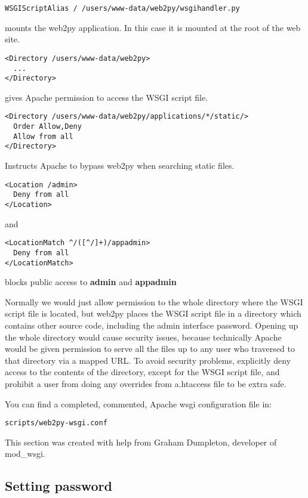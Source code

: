 \documentclass[justified,sixbynine,notoc]{tufte-book}
\begin{document}
\begin{fullwidth}
\begin{lstlisting}
WSGIScriptAlias / /users/www-data/web2py/wsgihandler.py
\end{lstlisting}
\noindent mounts the web2py application. In this case it is mounted at the root
of the web site.
\begin{lstlisting}[keywords={}]
<Directory /users/www-data/web2py>
  ...
</Directory>
\end{lstlisting}
\noindent gives Apache permission to access the WSGI script file.
\begin{lstlisting}[keywords={}]
<Directory /users/www-data/web2py/applications/*/static/>
  Order Allow,Deny
  Allow from all
</Directory>
\end{lstlisting}

Instructs Apache to bypass web2py when searching static files.
\begin{lstlisting}[keywords={}]
<Location /admin>
  Deny from all
</Location>
\end{lstlisting}
\noindent and
\begin{lstlisting}[keywords={}]
<LocationMatch ^/([^/]+)/appadmin>
  Deny from all
</LocationMatch>
\end{lstlisting}
\noindent blocks public access to {\bf admin} and {\bf appadmin}

Normally we would just allow permission to the whole directory where the WSGI
script file is located, but web2py places
the WSGI script file in a directory which contains other source code,
including the admin interface password. Opening up
the whole directory would cause security issues, because technically
Apache would be given permission to serve all the files up to any user
who traversed to that directory via a mapped URL.
To avoid security problems, explicitly deny access to the contents of
the directory, except for the WSGI script file, and prohibit a user
from doing any overrides from a.htaccess file to be extra safe.

You can find a completed, commented, Apache wsgi configuration file in:
\begin{lstlisting}
scripts/web2py-wsgi.conf
\end{lstlisting}

This section was created with help from Graham Dumpleton, developer of mod\_wsgi.

\goodbreak\subsection{Setting password}


\end{fullwidth}
\end{document}
